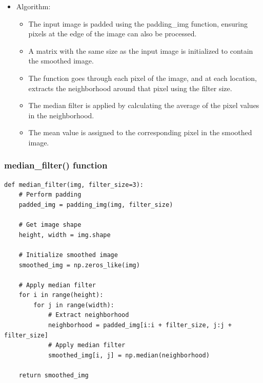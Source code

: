 \documentclass{article}
\begin{document}
\begin{itemize}
    
    \item Algorithm:
    \begin{itemize}
        \item The input image is padded using the padding\_img function, ensuring pixels at the edge of the image can also be processed.
        \item A matrix with the same size as the input image is initialized to contain the smoothed image.
        \item The function goes through each pixel of the image, and at each location, extracts the neighborhood around that pixel using the filter size.

        \item The median filter is applied by calculating the average of the pixel values in the neighborhood.
        \item The mean value is assigned to the corresponding pixel in the smoothed image.
   
    \end{itemize}
\end{itemize}



\subsubsection{median\_filter() function}
\begin{lstlisting}[caption={Code of median\_filter() function}, label={median\_filter()}]
def median_filter(img, filter_size=3):
    # Perform padding
    padded_img = padding_img(img, filter_size)

    # Get image shape
    height, width = img.shape

    # Initialize smoothed image
    smoothed_img = np.zeros_like(img)

    # Apply median filter
    for i in range(height):
        for j in range(width):
            # Extract neighborhood
            neighborhood = padded_img[i:i + filter_size, j:j + filter_size]
            # Apply median filter
            smoothed_img[i, j] = np.median(neighborhood)

    return smoothed_img
\end{lstlisting}
\end{document}
